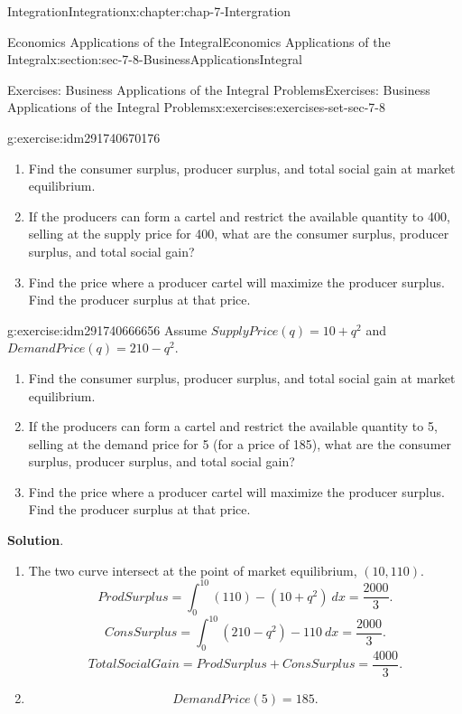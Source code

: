 \documentclass[oneside,10pt,]{book}
\numberwithin{equation}{section}
\begin{document}
\begin{chapterptx}{Integration}{}{Integration}{}{}{x:chapter:chap-7-Intergration}
\begin{sectionptx}{Economics Applications of the Integral}{}{Economics Applications of the Integral}{}{}{x:section:sec-7-8-BusinessApplicationsIntegral}
\begin{exercises-subsection}{Exercises: Business Applications of the Integral Problems}{}{Exercises: Business Applications of the Integral Problems}{}{}{x:exercises:exercises-set-sec-7-8}
\begin{divisionexercise}{8}{}{}{g:exercise:idm291740670176}
%
\begin{enumerate}[label=(\alph*)]
\item{}Find the consumer surplus, producer surplus, and total social gain at market equilibrium.%
\item{}If the producers can form a cartel and restrict the available quantity to 400, selling at the supply price for 400, what are the consumer surplus, producer surplus, and total social gain?%
\item{}Find the price where a producer cartel will maximize the producer surplus.  Find the producer surplus at that price.%
\end{enumerate}
\end{divisionexercise}%
\begin{divisionexercise}{9}{}{}{g:exercise:idm291740666656}%
Assume \(SupplyPrice(q)= 10+q^2\) and \(DemandPrice(q)= 210-q^2\).%
%
\begin{enumerate}[label=(\alph*)]
\item{}Find the consumer surplus, producer surplus, and total social gain at market equilibrium.%
\item{}If the producers can form a cartel and restrict the available quantity to 5, selling at the demand price for 5 (for a price of 185), what are the consumer surplus, producer surplus, and total social gain?%
\item{}Find the price where a producer cartel will maximize the producer surplus.  Find the producer surplus at that price.%
\end{enumerate}
\par\smallskip%
\noindent\textbf{Solution}.\hypertarget{g:solution:idm291740662448}{}\quad{}%
\begin{enumerate}[label=(\alph*)]
\item{}The two curve intersect at the point of market equilibrium, \((10, 110)\).%
%
\begin{equation*}
ProdSurplus=
\int_0^{10}
(110)-
(10+q^2)\ dx=\frac{2000}{3}.
\end{equation*}
%
\begin{equation*}
ConsSurplus=
\int_0^{10}
(210-q^2)-110\ dx=\frac{2000}{3}.
\end{equation*}
%
\begin{equation*}
TotalSocialGain=ProdSurplus+ConsSurplus=\frac{4000}{3}.
\end{equation*}
\item{}%
\begin{equation*}
DemandPrice(5)=185.
\end{equation*}

\end{enumerate}
\end{divisionexercise}
\end{exercises-subsection}
\end{sectionptx}
\end{chapterptx}
\end{document}
